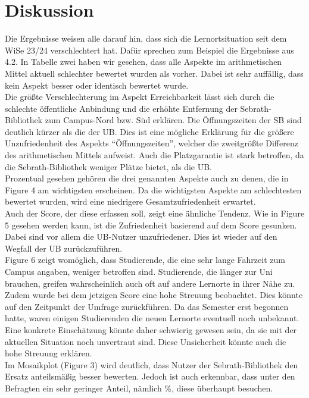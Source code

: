 \documentclass[11pt, a4paper]{article}
\begin{document}
\section{Diskussion}
Die Ergebnisse weisen alle darauf hin, dass sich die Lernortsituation seit dem WiSe 23/24 verschlechtert hat. Dafür sprechen zum Beispiel die Ergebnisse aus 4.2. In Tabelle zwei haben wir gesehen, dass alle Aspekte im arithmetischen Mittel aktuell schlechter bewertet wurden als vorher. Dabei ist sehr auffällig, dass kein Aspekt besser oder identisch bewertet wurde.\\
Die größte Verschlechterung im Aspekt Erreichbarkeit lässt sich durch die schlechte öffentliche Anbindung und die erhöhte Entfernung der Sebrath-Bibliothek zum Campus-Nord bzw. Süd erklären.  Die Öffnungszeiten der SB sind deutlich kürzer als die der UB. Dies ist eine mögliche Erklärung für die größere Unzufriedenheit des Aspekts “Öffnungszeiten”, welcher die zweitgrößte Differenz des arithmetischen Mittels aufweist. Auch die Platzgarantie ist stark betroffen, da die Sebrath-Bibliothek weniger Plätze bietet, als die UB. \\
Prozentual gesehen gehören die drei genannten Aspekte auch zu denen, die in Figure 4 am wichtigsten erscheinen. Da die wichtigsten Aspekte am schlechtesten bewertet wurden, wird eine niedrigere Gesamtzufriedenheit erwartet.\\
Auch der Score, der diese erfassen soll, zeigt eine ähnliche Tendenz. Wie in Figure 5 gesehen werden kann, ist die Zufriedenheit basierend auf dem Score gesunken.
Dabei sind vor allem die UB-Nutzer unzufriedener. Dies ist wieder auf den Wegfall der UB zurückzuführen.\\

Figure 6 zeigt womöglich, dass Studierende, die eine sehr lange Fahrzeit zum Campus angaben, weniger betroffen sind. Studierende, die länger zur Uni brauchen, greifen wahrscheinlich auch oft auf andere Lernorte in ihrer Nähe zu. \\

Zudem wurde bei dem jetzigen Score eine hohe Streuung beobachtet. Dies könnte auf den Zeitpunkt der Umfrage zurückführen. Da das Semester erst begonnen hatte, waren einigen Studierenden die neuen Lernorte eventuell noch unbekannt. Eine konkrete Einschätzung könnte daher schwierig gewesen sein, da sie mit der aktuellen Situation noch unvertraut sind. Diese Unsicherheit könnte auch die hohe Streuung erklären.\\

Im Mosaikplot (Figure 3) wird deutlich, dass Nutzer der Sebrath-Bibliothek den Ersatz anteilsmäßig besser bewerten. Jedoch ist auch erkennbar, dass unter den Befragten ein sehr geringer Anteil, nämlich \%, diese überhaupt besuchen.\\
\end{document}
